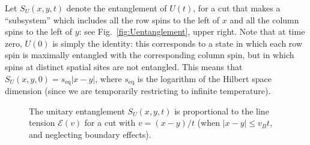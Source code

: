 \documentclass[aps,prx,twocolumn,superscriptaddress,floatfix,nofootinbib,prx]{revtex4}
\renewcommand{\>}{\right\rangle}
\newcommand{\<}{\left\langle}
\newcommand{\seq}{s_\text{eq}}
\newcommand{\lt}{\mathcal{E}}
\begin{document}
Let  $S_{U}(x,y,t)$ denote the entanglement of $U(t)$, for a cut that makes a ``subsystem'' which includes all the row spins to the left of $x$ and all the column spins to the left of $y$: see Fig.~\ref{fig:Uentanglement}, upper right.  Note that at time zero, $U(0)$ is simply the identity: this corresponds to a  state in which each row spin is maximally entangled with the corresponding column spin, but in which spins at distinct spatial sites are not entangled. This means that ${S_U(x,y,0) = \seq |x-y|}$, where $\seq$ is the logarithm of the Hilbert space dimension (since we are temporarily restricting to infinite temperature).





\begin{figure}[t]
\caption{The unitary entanglement $S_U(x,y,t)$ is proportional to the line tension $\lt(v)$ for a cut with $v=(x-y)/t$ (when $|x-y|\leq v_B t$, and neglecting boundary effects).}
 \label{fig:unitarycut}
\end{figure}
\end{document}
